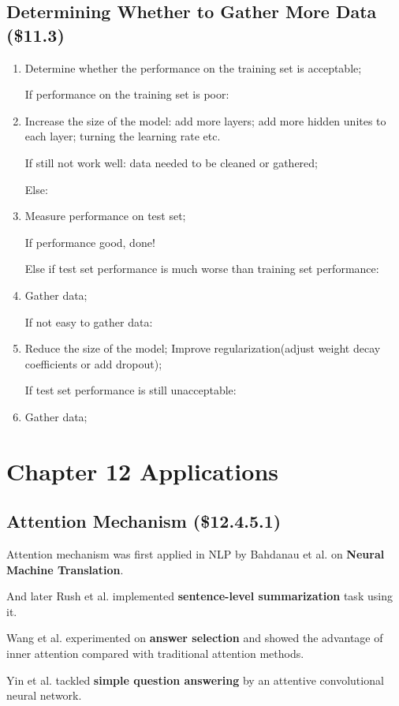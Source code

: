 \documentclass[12pt]{article}
\numberwithin{equation}{section}
\begin{document}
\subsection{Determining Whether to Gather More Data (\$11.3)}
\begin{enumerate}
	\item Determine whether the performance on the training set is acceptable; \par
	If performance on the training set is poor:
	\item Increase the size of the model: add more layers; add more hidden unites to each layer; turning 
	the learning rate etc. \par
	If still not work well: data needed to be cleaned or gathered; \par
	Else:
	\item Measure performance on test set; \par
	If performance good, done!\par
	Else if test set performance is much worse than training set performance:
	\item Gather data;\par
	If not easy to gather data:
	\item Reduce the size of the model; Improve regularization(adjust weight decay coefficients or add dropout); \par
	If test set performance is still unacceptable:
	\item Gather data;
\end{enumerate}
\section{Chapter 12 Applications}
\subsection{Attention Mechanism (\$12.4.5.1)}
	Attention mechanism was first applied in NLP by Bahdanau et al.\citep{bahdanau2014neural} on \textbf{Neural Machine Translation}.\par
	And later Rush et al.\citep{rush2015neural} implemented \textbf{sentence-level summarization} task using it. \par
	Wang et al.\citep{wang2016inner} experimented on \textbf{answer selection} and showed the advantage of inner attention compared with traditional attention methods. \par
	Yin et al.\citep{yin2016simple} tackled \textbf{simple question answering} by an attentive convolutional neural network. \par
\end{document}

